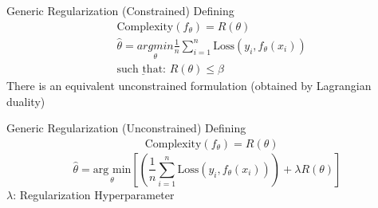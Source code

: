 \documentclass[aspectratio=169]{../latex_main/tntbeamer}  %
\begin{document}
	
	\begin{frame}{Generic Regularization (Constrained)}
	    Defining 
	    \begin{align*}
	        &\text{Complexity}(f_\theta) = R(\theta)\\
	        &\hat{\theta} = \underset{\theta}{arg min} \frac{1}{n}\sum\limits_{i=1}^n\text{Loss}(y_i,f_\theta(x_i))\\
	        &\underline{\text{such that: }} R(\theta) \leq \beta
	    \end{align*}
	    There is an equivalent unconstrained formulation (obtained by Lagrangian duality)

	\end{frame}
	
	
	\begin{frame}{Generic Regularization (Unconstrained)}
	    Defining 
	    \begin{align*}
	        &\text{Complexity}(f_\theta) = R(\theta)
	    \end{align*}
	    \begin{equation*}
	        \hat{\theta} = \underset{\theta}{\text{arg min}}\left[ \left(\frac{1}{n}\sum\limits_{i=1}^n\text{Loss}(y_i,f_\theta(x_i)) \right) + \lambda R(\theta)\right]
	    \end{equation*}
        $\lambda$: Regularization Hyperparameter

	\end{frame}
	
\end{document}
